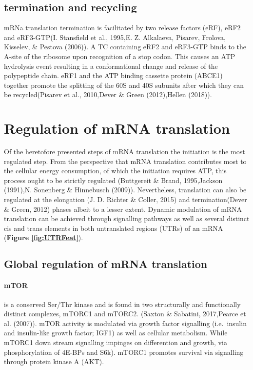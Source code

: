 \documentclass[12pt,openany]{book}
\begin{document}
\clearpage

\subsection{termination and recycling}

mRNa translation termination is facilitated by two release factors
(eRF), eRF2 and eRF3-GTP(I. Stansfield et al., 1995,E. Z. Alkalaeva,
Pisarev, Frolova, Kisselev, \& Pestova (2006)). A TC containing eRF2 and
eRF3-GTP binds to the A-site of the ribosome upon recognition of a stop
codon. This causes an ATP hydrolysis event resulting in a conformational
change and release of the polypeptide chain. eRF1 and the ATP binding
cassette protein (ABCE1) together promote the splitting of the 60S and
40S subunits after which they can be recycled(Pisarev et al., 2010,Dever
\& Green (2012),Hellen (2018)).

\section{Regulation of mRNA translation}

Of the heretofore presented steps of mRNA translation the initiation is
the most regulated step. From the perspective that mRNA translation
contributes most to the cellular energy consumption, of which the
initiation requires ATP, this process ought to be strictly regulated
(Buttgereit \& Brand, 1995,Jackson (1991),N. Sonenberg \& Hinnebusch
(2009)). Nevertheless, translation can also be regulated at the
elongation (J. D. Richter \& Coller, 2015) and termination(Dever \&
Green, 2012) phases albeit to a lesser extent. Dynamic modulation of
mRNA translation can be achieved through signalling pathways as well as
several distinct cis and trans elements in both untranslated regions
(UTRs) of an mRNA (\textbf{Figure \ref{fig:UTRFeat}}).

\subsection{Global regulation of mRNA translation}

\paragraph{mTOR} \label{mTOR}

is a conserved Ser/Thr kinase and is found in two structurally and
functionally distinct complexes, mTORC1 and mTORC2. (Saxton \& Sabatini,
2017,Pearce et al. (2007)). mTOR activity is modulated via growth factor
signalling (i.e.~insulin and insulin-like growth factor; IGF1) as well
as cellular metabolism. While mTORC1 down stream signalling impinges on
differention and growth, via phosphorylation of 4E-BPs and S6k). mTORC1
promotes survival via signalling through protein kinase A (AKT).
\end{document}
